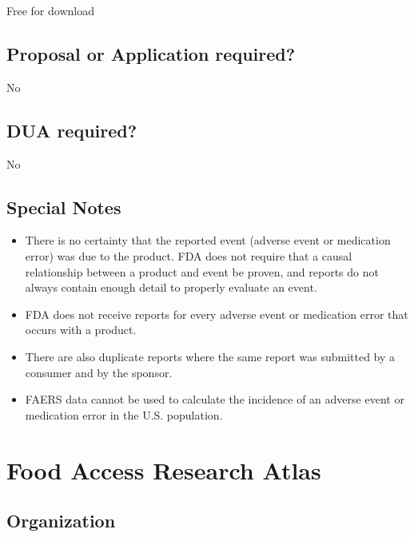 \documentclass[
]{book}
\providecommand{\tightlist}{%
  \setlength{\itemsep}{0pt}\setlength{\parskip}{0pt}}
\begin{document}
Free for download

\hypertarget{proposal-or-application-required-24}{%
\section{Proposal or Application required?}\label{proposal-or-application-required-24}}

No

\hypertarget{dua-required-24}{%
\section{DUA required?}\label{dua-required-24}}

No

\hypertarget{special-notes-24}{%
\section{Special Notes}\label{special-notes-24}}

\begin{itemize}
\tightlist
\item
  There is no certainty that the reported event (adverse event or medication error) was due to the product. FDA does not require that a causal relationship between a product and event be proven, and reports do not always contain enough detail to properly evaluate an event.
\item
  FDA does not receive reports for every adverse event or medication error that occurs with a product.
\item
  There are also duplicate reports where the same report was submitted by a consumer and by the sponsor.
\item
  FAERS data cannot be used to calculate the incidence of an adverse event or medication error in the U.S. population.
\end{itemize}

\mainmatter

\hypertarget{food-access-research-atlas}{%
\chapter{Food Access Research Atlas}\label{food-access-research-atlas}}

\hypertarget{organization-25}{%
\section{Organization}\label{organization-25}}
\end{document}

